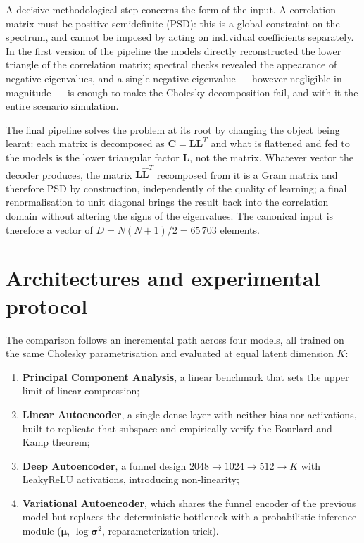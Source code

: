 \documentclass[11pt,a4paper]{article}
\begin{document}
A decisive methodological step concerns the form of the input. A correlation
matrix must be positive semidefinite (PSD): this is a global constraint on the
spectrum, and cannot be imposed by acting on individual coefficients
separately. In the first version of the pipeline the models directly
reconstructed the lower triangle of the correlation matrix; spectral checks
revealed the appearance of negative eigenvalues, and a single negative
eigenvalue --- however negligible in magnitude --- is enough to make the
Cholesky decomposition fail, and with it the entire scenario simulation.

The final pipeline solves the problem at its root by changing the object being
learnt: each matrix is decomposed as $\mathbf{C} = \mathbf{L}\mathbf{L}^T$ and
what is flattened and fed to the models is the lower triangular factor
$\mathbf{L}$, not the matrix. Whatever vector the decoder produces, the matrix
$\hat{\mathbf{L}}\hat{\mathbf{L}}^T$ recomposed from it is a Gram matrix and
therefore PSD by construction, independently of the quality of learning; a
final renormalisation to unit diagonal brings the result back into the
correlation domain without altering the signs of the eigenvalues. The
canonical input is therefore a vector of $D = N(N{+}1)/2 = 65\,703$ elements.

\section{Architectures and experimental protocol}

The comparison follows an incremental path across four models, all trained on
the same Cholesky parametrisation and evaluated at equal latent dimension $K$:

\begin{enumerate}[leftmargin=1.4em,itemsep=0.25em,topsep=0.35em]
  \item \textbf{Principal Component Analysis}, a linear benchmark that sets the
        upper limit of linear compression;
  \item \textbf{Linear Autoencoder}, a single dense layer with neither bias nor
        activations, built to replicate that subspace and empirically verify
        the Bourlard and Kamp theorem;
  \item \textbf{Deep Autoencoder}, a funnel design
        $2048 \to 1024 \to 512 \to K$ with LeakyReLU activations, introducing
        non-linearity;
  \item \textbf{Variational Autoencoder}, which shares the funnel encoder of
        the previous model but replaces the deterministic bottleneck with a
        probabilistic inference module ($\boldsymbol{\mu}$,
        $\log\boldsymbol{\sigma}^2$, reparameterization trick).
\end{enumerate}
\end{document}
